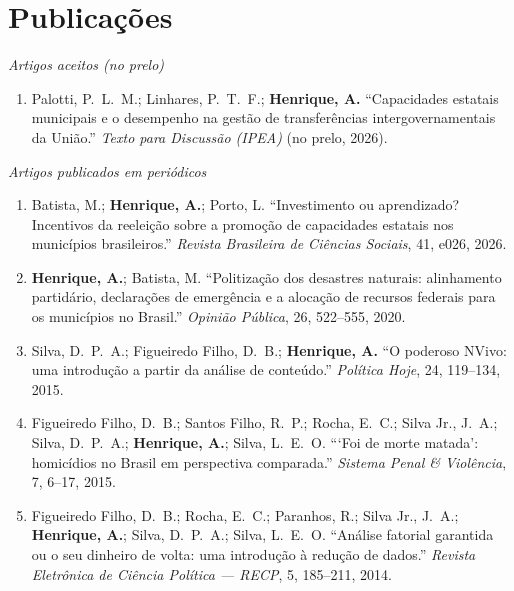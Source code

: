 \documentclass[11pt]{article}
\newcommand{\cvsubsection}[1]{\vspace{0.9em}\textit{#1}\par\vspace{0.35em}}
\begin{document}
\section{Publicações}
\cvsubsection{Artigos aceitos (no prelo)}
\begin{enumerate}[leftmargin=0.3in,itemsep=0.4em,parsep=0pt]
\item Palotti, P.\ L.\ M.; Linhares, P.\ T.\ F.; \textbf{Henrique, A.} ``Capacidades estatais municipais e o desempenho na gestão de transferências intergovernamentais da União.'' \textit{Texto para Discussão (IPEA)} (no prelo, 2026).
\end{enumerate}

\cvsubsection{Artigos publicados em periódicos}
\begin{enumerate}[leftmargin=0.3in,itemsep=0.4em,parsep=0pt]
\item Batista, M.; \textbf{Henrique, A.}; Porto, L. ``Investimento ou aprendizado? Incentivos da reeleição sobre a promoção de capacidades estatais nos municípios brasileiros.'' \textit{Revista Brasileira de Ciências Sociais}, 41, e026, 2026.
\item \textbf{Henrique, A.}; Batista, M. ``Politização dos desastres naturais: alinhamento partidário, declarações de emergência e a alocação de recursos federais para os municípios no Brasil.'' \textit{Opinião Pública}, 26, 522--555, 2020.
\item Silva, D.\ P.\ A.; Figueiredo Filho, D.\ B.; \textbf{Henrique, A.} ``O poderoso NVivo: uma introdução a partir da análise de conteúdo.'' \textit{Política Hoje}, 24, 119--134, 2015.
\item Figueiredo Filho, D.\ B.; Santos Filho, R.\ P.; Rocha, E.\ C.; Silva Jr., J.\ A.; Silva, D.\ P.\ A.; \textbf{Henrique, A.}; Silva, L.\ E.\ O. ```Foi de morte matada': homicídios no Brasil em perspectiva comparada.'' \textit{Sistema Penal \& Violência}, 7, 6--17, 2015.
\item Figueiredo Filho, D.\ B.; Rocha, E.\ C.; Paranhos, R.; Silva Jr., J.\ A.; \textbf{Henrique, A.}; Silva, D.\ P.\ A.; Silva, L.\ E.\ O. ``Análise fatorial garantida ou o seu dinheiro de volta: uma introdução à redução de dados.'' \textit{Revista Eletrônica de Ciência Política --- RECP}, 5, 185--211, 2014.
\end{enumerate}
\end{document}
